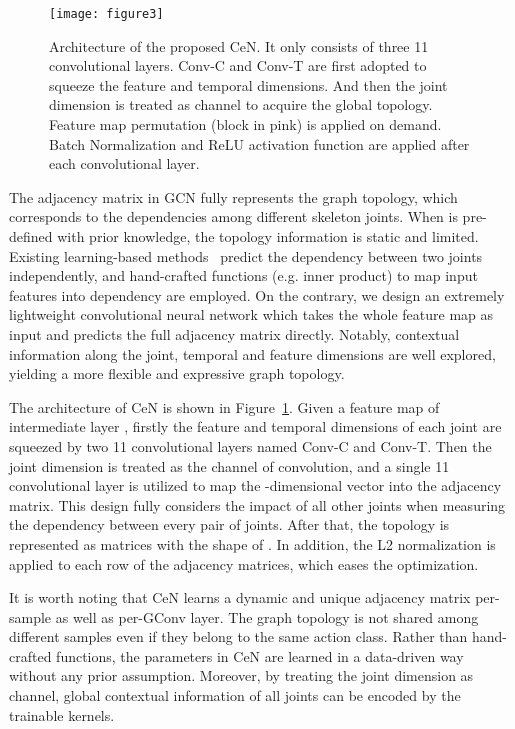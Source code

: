 \documentclass[sigconf]{acmart}
\begin{document}
\begin{figure}[t]
\centering
\texttt{[image: figure3]} \caption{Architecture of the proposed CeN. It only consists of three 11 convolutional layers. Conv-C and Conv-T are first adopted to squeeze the feature and temporal dimensions. And then the joint dimension is treated as channel to acquire the global topology. Feature map permutation (block in pink) is applied on demand. Batch Normalization and ReLU activation function are applied after each convolutional layer.}
\label{fig3}
\end{figure}

The adjacency matrix  in GCN fully represents the graph topology, which corresponds to the dependencies among different skeleton joints. When  is pre-defined with prior knowledge, the topology information is static and limited. Existing learning-based methods~\cite{zhang2019semantics,shi2019two,li2019spatio,liu2020} predict the dependency between two joints  independently, and hand-crafted functions (e.g. inner product) to map input features into dependency are employed. On the contrary, we design an extremely lightweight convolutional neural network which takes the whole feature map as input and predicts the full adjacency matrix  directly. Notably, contextual information along the joint, temporal and feature dimensions are well explored, yielding a more flexible and expressive graph topology.

The architecture of CeN is shown in Figure~\ref{fig3}. Given a feature map of intermediate layer , firstly the feature and temporal dimensions of each joint are squeezed by two 11 convolutional layers named Conv-C and Conv-T. Then the joint dimension is treated as the channel of convolution, and a single 11 convolutional layer is utilized to map the -dimensional vector into the  adjacency matrix. This design fully considers the impact of all other joints when measuring the dependency between every pair of joints. After that, the topology is represented as matrices with the shape of . In addition, the L2 normalization is applied to each row of the adjacency matrices, which eases the optimization.

It is worth noting that CeN learns a dynamic and unique adjacency matrix per-sample as well as per-GConv layer. The graph topology is not shared among different samples even if they belong to the same action class. Rather than hand-crafted functions, the parameters in CeN are learned in a data-driven way without any prior assumption. Moreover, by treating the joint dimension as channel, global contextual information of all joints can be encoded by the trainable kernels.
\end{document}
